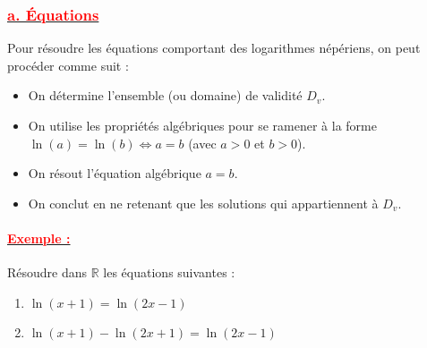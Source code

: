 \documentclass[12pt,a4paper]{article}
\begin{document}
\subsubsection*{\underline{\textbf{\textcolor{red}{a. Équations}}}}

Pour résoudre les équations comportant des logarithmes népériens, on peut procéder comme suit :
\begin{itemize}
    \item On détermine l'ensemble (ou domaine) de validité $D_v$.
    \item On utilise les propriétés algébriques pour se ramener à la forme $\ln(a) = \ln(b) \iff a = b$ (avec $a>0$ et $b>0$).
    \item On résout l'équation algébrique $a = b$.
    \item On conclut en ne retenant que les solutions qui appartiennent à $D_v$.
\end{itemize}

\paragraph{\underline{\textbf{\textcolor{red}{Exemple :}}}}
Résoudre dans $\mathbb{R}$ les équations suivantes :
\begin{enumerate}
    \item[a)] $\ln(x+1) = \ln(2x-1)$
    \item[b)] $\ln(x+1) - \ln(2x+1) = \ln(2x-1)$
\end{enumerate}
\end{document}
